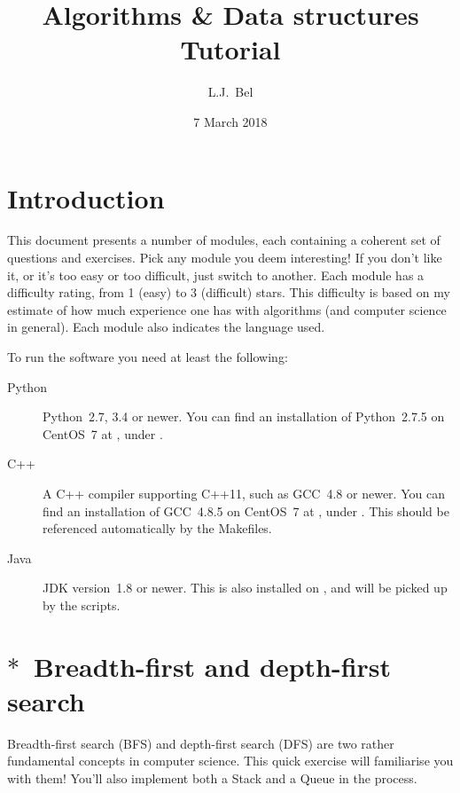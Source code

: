 \documentclass[12pt]{article}
\title{{Algorithms \& Data structures}\\{\large Tutorial}}
\author{L.J.~Bel}
\date{7 March 2018}
\begin{document}
\maketitle

\section*{Introduction}

This document presents a number of modules, each containing a coherent set of questions and exercises. Pick any module you deem interesting! If you don't like it, or it's too easy or too difficult, just switch to another. Each module has a difficulty rating, from 1 (easy) to 3 (difficult) stars. This difficulty is based on my estimate of how much experience one has with algorithms (and computer science in general). Each module also indicates the language used.

To run the software you need at least the following:
\begin{description}
    \item[Python] Python~2.7, 3.4 or newer. You can find an installation of Python~2.7.5 on CentOS~7 at , under .
    \item[C++] A C++ compiler supporting C++11, such as GCC~4.8 or newer. You can find an installation of GCC~4.8.5 on CentOS~7 at , under . This should be referenced automatically by the Makefiles.
    \item[Java] JDK version~1.8 or newer. This is also installed on , and will be picked up by the scripts.
\end{description}

\clearpage
\tableofcontents

\clearpage
\section{$\ast$~Breadth-first and depth-first search}

Breadth-first search (BFS) and depth-first search (DFS) are two rather fundamental concepts in computer science. This quick exercise will familiarise you with them! You'll also implement both a Stack and a Queue in the process.
\end{document}
